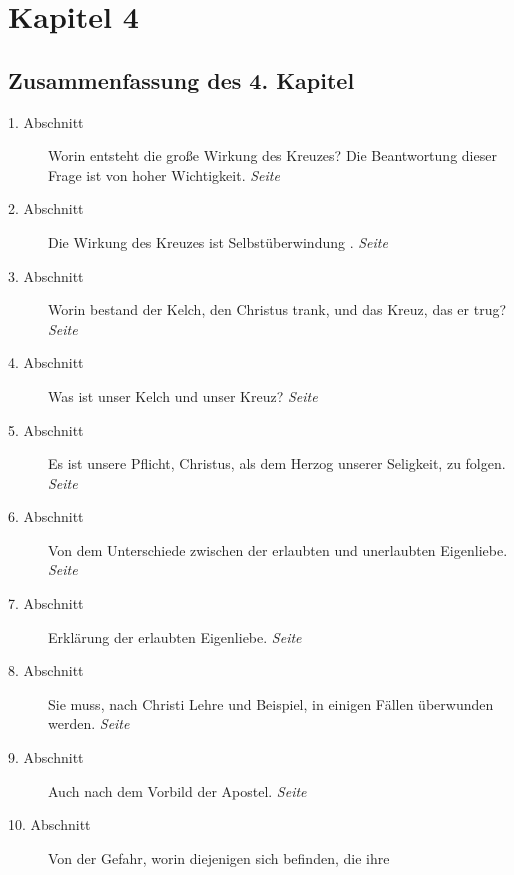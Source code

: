 

\chapter{Kapitel 4} \label{kap4}

\section{Zusammenfassung des 4. Kapitel}

\begin{description}
\item[1. Abschnitt] Worin entsteht die große Wirkung des Kreuzes? Die
Beantwortung dieser Frage ist von hoher Wichtigkeit.
\dotfill \textit{Seite~\pageref{kap4_ab1}}\\
\item[2. Abschnitt] Die Wirkung des Kreuzes ist Selbstüberwindung
.
\dotfill \textit{Seite~\pageref{kap4_ab2}}\\
\item[3. Abschnitt] Worin bestand der Kelch, den Christus trank, und das Kreuz,
das er trug?
\dotfill \textit{Seite~\pageref{kap4_ab3}}\\
\item[4. Abschnitt] Was ist unser Kelch und unser Kreuz?
\dotfill \textit{Seite~\pageref{kap4_ab4}}\\
\item[5. Abschnitt] Es ist unsere Pflicht, Christus, als dem Herzog unserer
Seligkeit, zu folgen.
\dotfill \textit{Seite~\pageref{kap4_ab5}}\\
\item[6. Abschnitt] Von dem Unterschiede zwischen der erlaubten und unerlaubten
Eigenliebe.
\dotfill \textit{Seite~\pageref{kap4_ab6}}\\
\item[7. Abschnitt] Erklärung der erlaubten Eigenliebe.
\dotfill \textit{Seite~\pageref{kap4_ab7}}\\
\item[8. Abschnitt] Sie muss, nach Christi Lehre und Beispiel, in einigen Fällen
überwunden werden.
\dotfill \textit{Seite~\pageref{kap4_ab8}}\\
\item[9. Abschnitt] Auch nach dem Vorbild der Apostel.
\dotfill \textit{Seite~\pageref{kap4_ab9}}\\
\item[10. Abschnitt] Von der Gefahr, worin diejenigen sich befinden, die ihre

\end{description}
